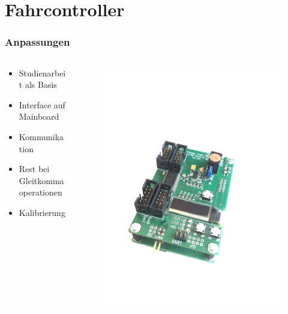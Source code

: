 \section{Fahrcontroller}

\begin{frame}
	\frametitle{Anpassungen}	
	\begin{columns}
		\begin{column}{0.6 \textwidth}
			\begin{itemize}
				\item Studienarbeit als Basis
				\item Interface auf Mainboard
				\item Kommunikation
				\item Rest bei Gleitkommaoperationen
				\item Kalibrierung
			\end{itemize}
		\end{column}
		\begin{column}{0.4 \textwidth}
			\vspace{-2.8em}
			\begin{figure}[h]
				\centering
				\includegraphics[width = 1 \textwidth]{../images/presentation/dc.jpg}
			\end{figure}
		\end{column}
	\end{columns}
	

\end{frame}

